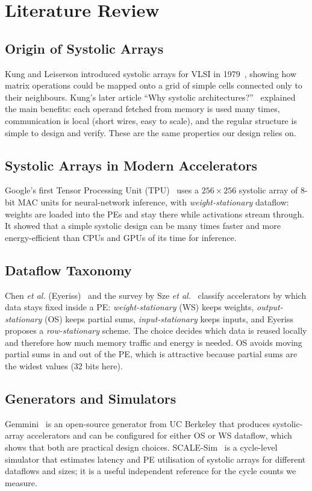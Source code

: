 \documentclass[conference,a4paper]{IEEEtran}
\begin{document}
\section{Literature Review}

\subsection{Origin of Systolic Arrays}
Kung and Leiserson introduced systolic arrays for VLSI in 1979~\cite{kung1979}, showing how matrix operations could be mapped onto a grid of simple cells connected only to their neighbours. Kung's later article ``Why systolic architectures?''~\cite{kung1982} explained the main benefits: each operand fetched from memory is used many times, communication is local (short wires, easy to scale), and the regular structure is simple to design and verify. These are the same properties our design relies on.

\subsection{Systolic Arrays in Modern Accelerators}
Google's first Tensor Processing Unit (TPU)~\cite{jouppi2017} uses a $256\times256$ systolic array of 8-bit MAC units for neural-network inference, with \emph{weight-stationary} dataflow: weights are loaded into the PEs and stay there while activations stream through. It showed that a simple systolic design can be many times faster and more energy-efficient than CPUs and GPUs of its time for inference.

\subsection{Dataflow Taxonomy}
Chen \emph{et al.} (Eyeriss)~\cite{chen2016} and the survey by Sze \emph{et al.}~\cite{sze2017} classify accelerators by which data stays fixed inside a PE: \emph{weight-stationary} (WS) keeps weights, \emph{output-stationary} (OS) keeps partial sums, \emph{input-stationary} keeps inputs, and Eyeriss proposes a \emph{row-stationary} scheme. The choice decides which data is reused locally and therefore how much memory traffic and energy is needed. OS avoids moving partial sums in and out of the PE, which is attractive because partial sums are the widest values (32 bits here).

\subsection{Generators and Simulators}
Gemmini~\cite{genc2021} is an open-source generator from UC Berkeley that produces systolic-array accelerators and can be configured for either OS or WS dataflow, which shows that both are practical design choices. SCALE-Sim~\cite{samajdar2018} is a cycle-level simulator that estimates latency and PE utilisation of systolic arrays for different dataflows and sizes; it is a useful independent reference for the cycle counts we measure.
\end{document}
